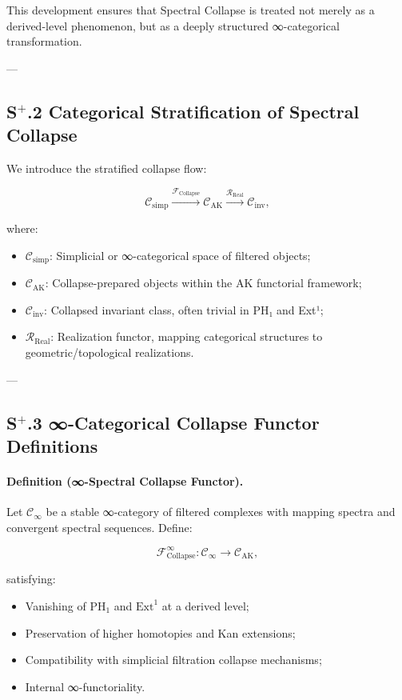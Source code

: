 \documentclass[11pt]{article}
\begin{document}
This development ensures that Spectral Collapse is treated not merely as a derived-level phenomenon, but as a deeply structured ∞-categorical transformation.

---

\subsection*{S$^{+}$.2 Categorical Stratification of Spectral Collapse}

We introduce the stratified collapse flow:

\[
\mathcal{C}_{\mathrm{simp}} 
\xrightarrow{\mathcal{F}_{\mathrm{Collapse}}} 
\mathcal{C}_{\mathrm{AK}} 
\xrightarrow{\mathcal{R}_{\mathrm{Real}}} 
\mathcal{C}_{\mathrm{inv}},
\]

where:

\begin{itemize}
    \item $\mathcal{C}_{\mathrm{simp}}$: Simplicial or ∞-categorical space of filtered objects;
    \item $\mathcal{C}_{\mathrm{AK}}$: Collapse-prepared objects within the AK functorial framework;
    \item $\mathcal{C}_{\mathrm{inv}}$: Collapsed invariant class, often trivial in PH₁ and Ext¹;
    \item $\mathcal{R}_{\mathrm{Real}}$: Realization functor, mapping categorical structures to geometric/topological realizations.
\end{itemize}

---

\subsection*{S$^{+}$.3 ∞-Categorical Collapse Functor Definitions}

\paragraph{Definition (∞-Spectral Collapse Functor).}
Let $\mathcal{C}_\infty$ be a stable ∞-category of filtered complexes with mapping spectra and convergent spectral sequences. Define:

\[
\mathcal{F}_{\mathrm{Collapse}}^\infty : \mathcal{C}_\infty \longrightarrow \mathcal{C}_{\mathrm{AK}},
\]

satisfying:

\begin{itemize}
    \item Vanishing of $\mathrm{PH}_1$ and $\mathrm{Ext}^1$ at a derived level;
    \item Preservation of higher homotopies and Kan extensions;
    \item Compatibility with simplicial filtration collapse mechanisms;
    \item Internal ∞-functoriality.
\end{itemize}
\end{document}
